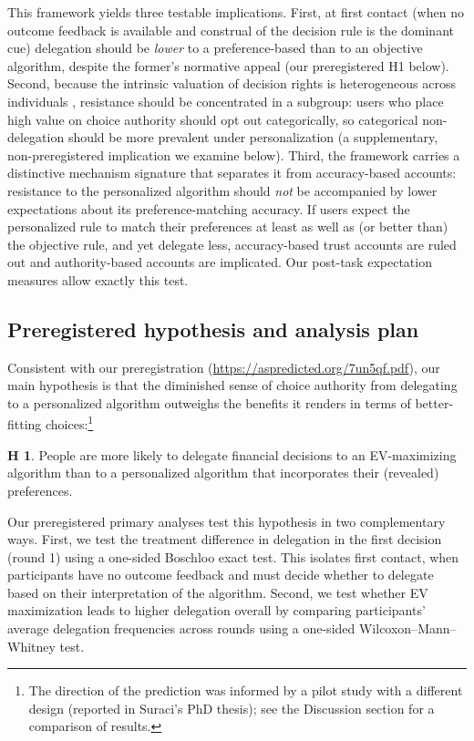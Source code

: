 \documentclass[a4paper, 12pt, fleqn]{article}
\theoremstyle{definition}
\newtheorem{hyp}{H}
\begin{document}
This framework yields three testable implications. First, at first contact (when no outcome feedback is available and construal of the decision rule is the dominant cue) delegation should be \emph{lower} to a preference-based than to an objective algorithm, despite the former's normative appeal (our preregistered H1 below). Second, because the intrinsic valuation of decision rights is heterogeneous across individuals \citep{Bartling2014,Owens2014}, resistance should be concentrated in a subgroup: users who place high value on choice authority should opt out categorically, so categorical non-delegation should be more prevalent under personalization (a supplementary, non-preregistered implication we examine below). Third, the framework carries a distinctive mechanism signature that separates it from accuracy-based accounts: resistance to the personalized algorithm should \emph{not} be accompanied by lower expectations about its preference-matching accuracy. If users expect the personalized rule to match their preferences at least as well as (or better than) the objective rule, and yet delegate less, accuracy-based trust accounts are ruled out and authority-based accounts are implicated. Our post-task expectation measures allow exactly this test.

\subsection*{Preregistered hypothesis and analysis plan}
Consistent with our preregistration ({\scriptsize\url{https://aspredicted.org/7un5qf.pdf}}), our main hypothesis is that the diminished sense of choice authority from delegating to a personalized algorithm outweighs the benefits it renders in terms of better-fitting choices:\footnote{The direction of the prediction was informed by a pilot study with a different design (reported in Suraci's PhD thesis); see the Discussion section for a comparison of results.}
\begin{hyp}
	People are more likely to delegate financial decisions to an EV-maximizing algorithm than to a personalized algorithm that incorporates their (revealed) preferences.
\end{hyp}

Our preregistered primary analyses test this hypothesis in two complementary ways. First, we test the treatment difference in delegation in the first decision (round 1) using a one-sided Boschloo exact test. This isolates first contact, when participants have no outcome feedback and must decide whether to delegate based on their interpretation of the algorithm. Second, we test whether EV maximization leads to higher delegation overall by comparing participants' average delegation frequencies across rounds using a one-sided Wilcoxon--Mann--Whitney test.
\end{document}
